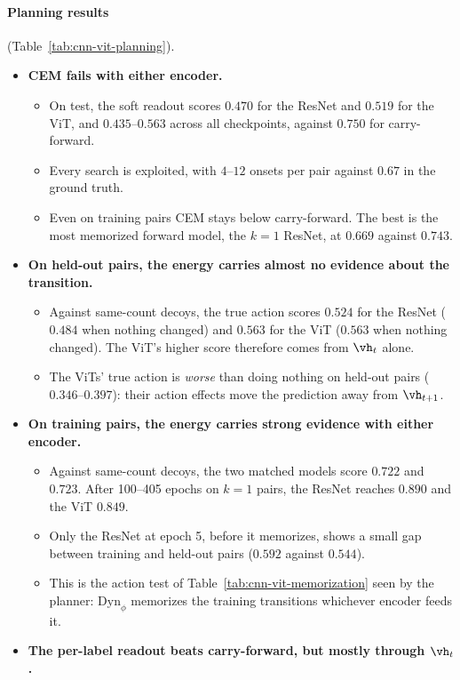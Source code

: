 \paragraph{Planning results} (Table~\ref{tab:cnn-vit-planning}).
\begin{itemize}
\item \textbf{CEM fails with either encoder.}
  \begin{itemize}
  \item On test, the soft readout scores $0.470$ for the ResNet and $0.519$ for the ViT, and $0.435$--$0.563$ across all checkpoints, against $0.750$ for carry-forward.
  \item Every search is exploited, with $4$--$12$ onsets per pair against $0.67$ in the ground truth.
  \item Even on training pairs CEM stays below carry-forward. The best is the most memorized forward model, the $k=1$ ResNet, at $0.669$ against $0.743$.
  \end{itemize}
\item \textbf{On held-out pairs, the energy carries almost no evidence about the transition.}
  \begin{itemize}
  \item Against same-count decoys, the true action scores $0.524$ for the ResNet ($0.484$ when nothing changed) and $0.563$ for the ViT ($0.563$ when nothing changed). The ViT's higher score therefore comes from $\vh_t$ alone.
  \item The ViTs' true action is \emph{worse} than doing nothing on held-out pairs ($0.346$--$0.397$): their action effects move the prediction away from $\vh_{t+1}$.
  \end{itemize}
\item \textbf{On training pairs, the energy carries strong evidence with either encoder.}
  \begin{itemize}
  \item Against same-count decoys, the two matched models score $0.722$ and $0.723$. After 100--405 epochs on $k=1$ pairs, the ResNet reaches $0.890$ and the ViT $0.849$.
  \item Only the ResNet at epoch 5, before it memorizes, shows a small gap between training and held-out pairs ($0.592$ against $0.544$).
  \item This is the action test of Table~\ref{tab:cnn-vit-memorization} seen by the planner: $\text{Dyn}_\phi$ memorizes the training transitions whichever encoder feeds it.
  \end{itemize}
\item \textbf{The per-label readout beats carry-forward, but mostly through $\vh_t$.}

\end{itemize}
